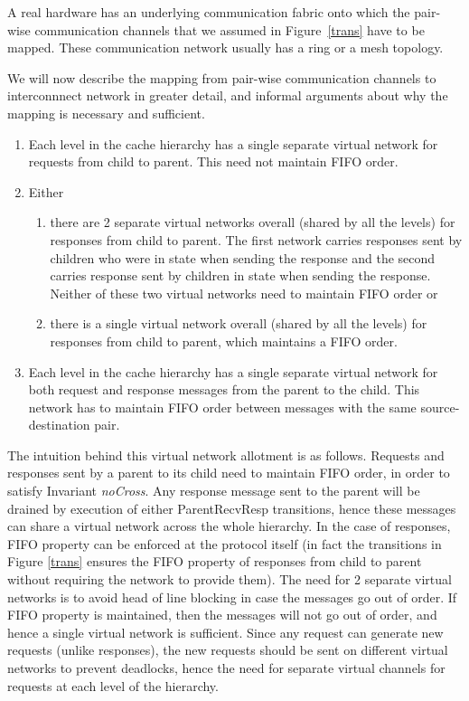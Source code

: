 
A real hardware has an underlying communication fabric onto which the pair-wise
communication channels that we assumed in Figure~\ref{trans} have to be mapped.
These communication network usually has a ring or a mesh topology.

We will now describe the mapping from pair-wise communication channels
to interconnnect network in greater detail, and informal arguments
about why the mapping is necessary and sufficient.

\begin{enumerate}
\item Each level in the cache hierarchy has a single separate virtual network
for requests from child to parent. This need not maintain FIFO order.
\item Either
\begin{enumerate}
\item there are 2 separate virtual networks overall (shared by all the levels)
for responses from child to parent. The first network carries responses sent by
children who were in state \Mo{} when sending the response and the second
carries response sent by children in state \Sh{} when sending the response.
Neither of these two virtual networks need to maintain FIFO order or
\item there is a single virtual network overall (shared by all the levels) for
responses from child to parent, which maintains a FIFO order.
\end{enumerate}
\item Each level in the cache hierarchy has a single separate virtual network
for both request and response messages from the parent to the child. This
network has to maintain FIFO order between messages with the same
source-destination pair.
\end{enumerate}

The intuition behind this virtual network allotment is as follows. Requests and
responses sent by a parent to its child need to maintain FIFO order, in order
to satisfy Invariant \textit{noCross}. Any response message sent to the parent
will be drained by execution of either ParentRecvResp transitions, hence these
messages can share a virtual network across the whole hierarchy. In the case of
responses, FIFO property can be enforced at the protocol itself (in fact the
transitions in Figure \ref{trans} ensures the FIFO property of responses from
child to parent without requiring the network to provide them). The need for 2
separate virtual networks is to avoid head of line blocking in case the
messages go out of order. If FIFO property is maintained, then the messages
will not go out of order, and hence a single virtual network is sufficient.
Since any request can generate new requests (unlike responses), the new
requests should be sent on different virtual networks to prevent deadlocks,
hence the need for separate virtual channels for requests at each level of the
hierarchy.

